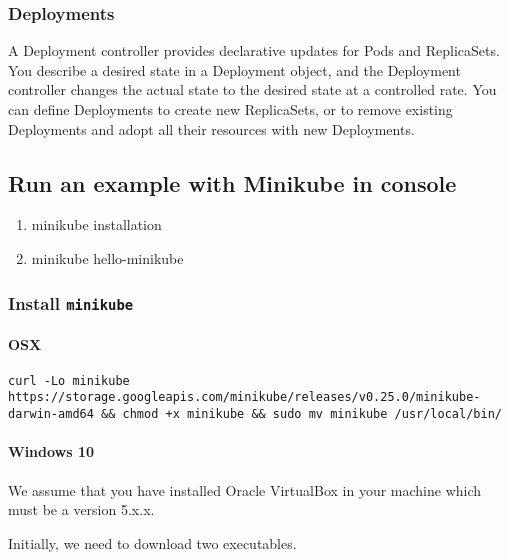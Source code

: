 \subsubsection{Deployments}\label{deployments}

A Deployment controller provides declarative updates for Pods and
ReplicaSets. You describe a desired state in a Deployment object, and
the Deployment controller changes the actual state to the desired state
at a controlled rate. You can define Deployments to create new
ReplicaSets, or to remove existing Deployments and adopt all their
resources with new Deployments.

\subsection{Run an example with Minikube in
console}\label{run-an-example-with-minikube-in-console}

\begin{enumerate}
\def\labelenumi{\arabic{enumi}.}

\item
  minikube installation
\item
  minikube hello-minikube
\end{enumerate}

\subsubsection{\texorpdfstring{Install
\texttt{minikube}}{Install minikube}}\label{install-minikube}

\paragraph{OSX}\label{osx}

\begin{verbatim}
curl -Lo minikube https://storage.googleapis.com/minikube/releases/v0.25.0/minikube-darwin-amd64 && chmod +x minikube && sudo mv minikube /usr/local/bin/
\end{verbatim}

\paragraph{Windows 10}\label{windows-10}

We assume that you have installed Oracle VirtualBox in your machine
which must be a version 5.x.x.

Initially, we need to download two executables.

